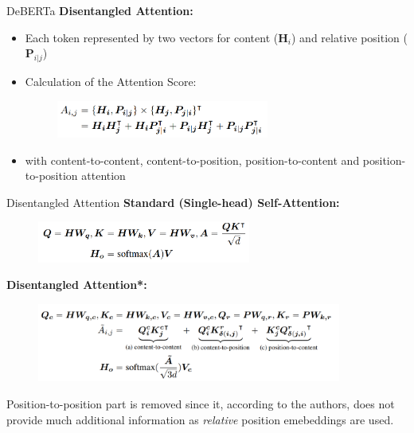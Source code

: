 \documentclass[]{beamer}
\begin{document}
\begin{frame}{DeBERTa \href{https://arxiv.org/pdf/2006.03654.pdf}{}}
\small
	\textbf{Disentangled Attention:}
	\begin{itemize}
		\item Each token represented by two vectors for content ($\mathbf{H}_i$) and relative position ($\mathbf{P}_{i|j}$) 
		\item Calculation of the Attention Score:
	\begin{figure}
		\centering
		\includegraphics[width = 7cm]{figure/deberta-attn.png}
	\end{figure}
		\item with content-to-content, content-to-position, position-to-content and position-to-position attention
	\end{itemize}
\end{frame}



\begin{frame}{Disentangled Attention}
	\textbf{Standard (Single-head) Self-Attention:}

	\begin{figure}
		\centering
		\includegraphics[width = 7cm]{figure/deberta-single.png}
	\end{figure}
	
	\textbf{Disentangled Attention*:}

	\begin{figure}
		\centering
		\includegraphics[width = 10cm]{figure/deberta-dis.png}
	\end{figure}
	

{\footnotesize *Position-to-position part is removed since it, according to the authors, does not provide much additional information as \textit{relative} position emebeddings are used.}
\end{frame}
\end{document}
